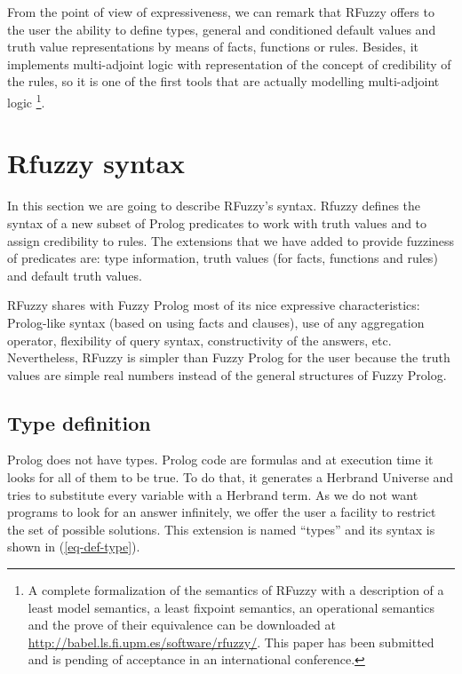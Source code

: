\documentclass[runningheads,a4paper]{llncs}
\begin{document}
From the point of view of expressiveness, we can remark that RFuzzy offers
to the user the ability to define types, general and conditioned
default values and truth value representations by means of facts,
functions or rules. 
Besides, it implements multi-adjoint logic with
representation of the concept of credibility of the rules, so it is one of the first tools that are actually modelling multi-adjoint logic
\footnote{A complete formalization of the semantics of RFuzzy with a
  description of a least model semantics, a least fixpoint semantics,
  an operational semantics and the prove of their equivalence 
  can be downloaded at 
  \url{http://babel.ls.fi.upm.es/software/rfuzzy/}.
  This paper has been submitted and is pending of
  acceptance in an international conference.}.
 


\section{Rfuzzy syntax}
\label{rfuzzy:syntax}

In this section we are going to describe RFuzzy's syntax.
Rfuzzy defines the syntax of a new subset of Prolog predicates 
to work with truth values and to assign credibility to rules. 
The extensions that we have added to provide fuzziness of 
predicates are:
type information, truth values (for facts, functions and rules) 
and default truth values.
 
RFuzzy shares with Fuzzy Prolog most of its nice
expressive characteristics: Prolog-like syntax (based on using facts
and clauses), use of any aggregation operator, flexibility of query
syntax, constructivity of the answers, etc. Nevertheless, RFuzzy is
simpler than Fuzzy Prolog for the user because the truth values are
simple real numbers instead of the general structures of Fuzzy Prolog.


\subsection{Type definition}
\label{type-definition}

Prolog does not have types. 
Prolog code are formulas and at execution time it looks for all of them to 
be true. 
To do that, it generates a Herbrand Universe and tries to 
substitute every variable with a Herbrand term. 
As we do not want programs to look for an answer infinitely, 
we offer the user a facility to restrict the set of possible solutions.
This extension is named ``types'' and its syntax is shown 
in (\ref{eq-def-type}).
\end{document}

